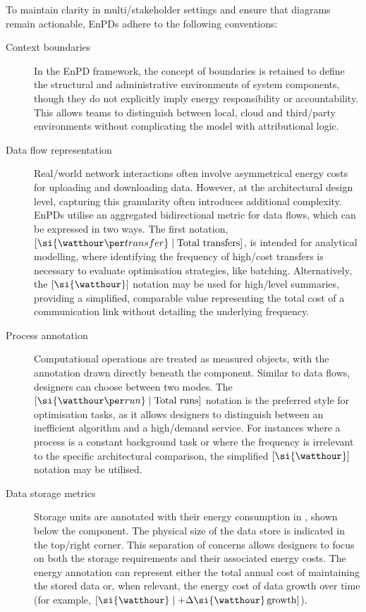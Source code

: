 To maintain clarity in multi\-/stakeholder settings and ensure that diagrams remain actionable, EnPDs adhere to the following conventions:
\begin{description}
  \item[Context boundaries] In the EnPD framework, the concept of boundaries is retained to define the structural and administrative environments of system components, though they do not explicitly imply energy responsibility or accountability.
  This allows teams to distinguish between local, cloud and third\-/party environments without complicating the model with attributional logic.
  \item[Data flow representation] Real\-/world network interactions often involve asymmetrical energy costs for uploading and downloading data.
  However, at the architectural design level, capturing this granularity often introduces additional complexity.
  EnPDs utilise an aggregated bidirectional metric for data flows, which can be expressed in two ways.
  The first notation, $[\si{\watthour\per transfer} \mid \text{Total transfers}]$, is intended for analytical modelling, where identifying the frequency of high\-/cost transfers is necessary to evaluate optimisation strategies, like batching.
  Alternatively, the $[\si{\watthour}]$ notation may be used for high\-/level summaries, providing a simplified, comparable value representing the total cost of a communication link without detailing the underlying frequency.
  \item[Process annotation] Computational operations are treated as measured objects, with the annotation drawn directly beneath the component.
  Similar to data flows, designers can choose between two modes.
  The $[\si{\watthour\per run} \mid \text{Total runs}]$ notation is the preferred style for optimisation tasks, as it allows designers to distinguish between an inefficient algorithm and a high\-/demand service.
  For instances where a process is a constant background task or where the frequency is irrelevant to the specific architectural comparison, the simplified $[\si{\watthour}]$ notation may be utilised.
  \item[Data storage metrics] Storage units are annotated with their energy consumption in \si{\watthour}, shown below the component.
  The physical size of the data store is indicated in the top\-/right corner.
  This separation of concerns allows designers to focus on both the storage requirements and their associated energy costs.
  The energy annotation can represent either the total annual cost of maintaining the stored data or, when relevant, the energy cost of data growth over time (for example, $[\si{\watthour} \mid + \Delta\si{\watthour}\,\text{growth}]$).

\end{description}
